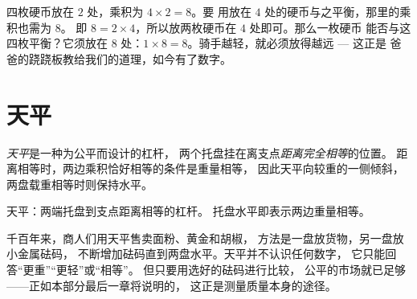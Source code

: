 \begin{example}[法则的应用]\label{ex:g3:levers-and-scales:using}
四枚硬币放在 $2$ 处，乘积为 $4 \times 2 = 8$。要
用放在 $4$ 处的硬币与之平衡，那里的乘积也需为 $8$。
即 $8 = 2 \times 4$，所以放两枚硬币在 $4$ 处即可。那么一枚硬币
能否与这四枚平衡？它须放在 $8$ 处：$1 \times 8
= 8$。骑手越轻，就必须放得越远 --- 这正是
爸爸的跷跷板教给我们的道理，如今有了数字。
\end{example}

\section{天平}

\begin{definition}[天平]\label{def:g3:levers-and-scales:scale}
\emph{天平}是一种为公平而设计的杠杆，
两个托盘挂在离支点\emph{距离完全相等}的位置。
距离相等时，两边乘积恰好相等的条件是重量相等，
因此天平向较重的一侧倾斜，
两盘载重相等时则保持水平。
\end{definition}

\begin{omfigure}

{\small 天平：两端托盘到支点距离相等的杠杆。
托盘水平即表示两边重量相等。}
\end{omfigure}

\begin{example}[通过比较称重]\label{ex:g3:levers-and-scales:weighing}
千百年来，商人们用天平售卖面粉、黄金和胡椒，
方法是一盘放货物，另一盘放小金属砝码，
不断增加砝码直到两盘水平。天平并不认识任何数字，
它只能回答“更重”“更轻”或“相等”。
但只要用选好的砝码进行比较，
公平的市场就已足够——正如本部分最后一章将说明的，
这正是测量质量本身的途径。
\end{example}

